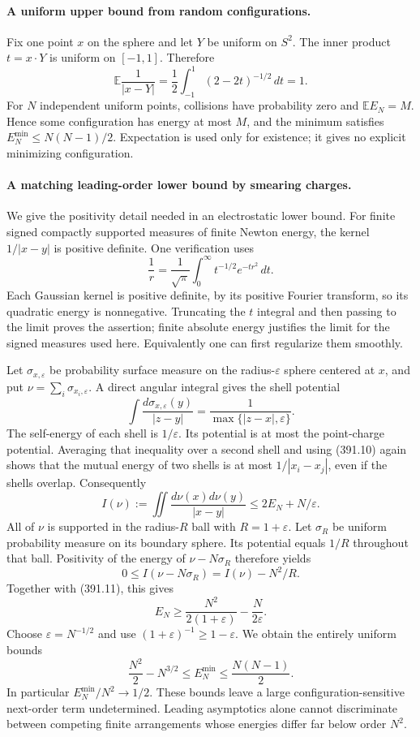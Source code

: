 \documentclass[11pt]{article}
\begin{document}
\paragraph{A uniform upper bound from random configurations.}
Fix one point $x$ on the sphere and let $Y$ be uniform on $S^2$.
The inner product $t=x\cdot Y$ is uniform on $[-1,1]$. Therefore
\[
 \mathbb E\frac1{|x-Y|}
   =\frac12\int_{-1}^1(2-2t)^{-1/2}\,dt=1.
\]
For $N$ independent uniform points, collisions have probability zero
and $\mathbb E E_N=M$. Hence some configuration has energy at most
$M$, and the minimum satisfies $E_N^{\min}\leq N(N-1)/2$.
Expectation is used only for existence; it gives no explicit
minimizing configuration.

\paragraph{A matching leading-order lower bound by smearing charges.}
We give the positivity detail needed in an electrostatic lower bound.
For finite signed compactly supported measures of finite Newton
energy, the kernel $1/|x-y|$ is positive definite. One verification
uses
\[
 \frac1r=\frac1{\sqrt\pi}\int_0^\infty t^{-1/2}e^{-tr^2}\,dt.
\]
Each Gaussian kernel is positive definite, by its positive Fourier
transform, so its quadratic energy is nonnegative. Truncating the
$t$ integral and then passing to the limit proves the assertion;
finite absolute energy justifies the limit for the signed measures
used here. Equivalently one can first regularize them smoothly.

Let $\sigma_{x,\varepsilon}$ be probability surface measure on the
radius-$\varepsilon$ sphere centered at $x$, and put
$\nu=\sum_i\sigma_{x_i,\varepsilon}$. A direct angular integral
gives the shell potential
\[
 \int\frac{d\sigma_{x,\varepsilon}(y)}{|z-y|}
   =\frac1{\max\{|z-x|,\varepsilon\}}.
 \tag{391.10}
\]
The self-energy of each shell is $1/\varepsilon$. Its potential
is at most the point-charge potential. Averaging that inequality
over a second shell and using (391.10) again shows that the mutual
energy of two shells is at most $1/|x_i-x_j|$, even if the shells
overlap. Consequently
\[
 I(\nu):=\iint\frac{d\nu(x)d\nu(y)}{|x-y|}
      \leq 2E_N+N/\varepsilon.
 \tag{391.11}
\]
All of $\nu$ is supported in the radius-$R$ ball with $R=1+\varepsilon$.
Let $\sigma_R$ be uniform probability measure on its boundary sphere.
Its potential equals $1/R$ throughout that ball. Positivity of the
energy of $\nu-N\sigma_R$ therefore yields
\[
 0\leq I(\nu-N\sigma_R)=I(\nu)-N^2/R.
\]
Together with (391.11), this gives
\[
 E_N\geq\frac{N^2}{2(1+\varepsilon)}-\frac N{2\varepsilon}.
 \tag{391.12}
\]
Choose $\varepsilon=N^{-1/2}$ and use
$(1+\varepsilon)^{-1}\geq1-\varepsilon$. We obtain the entirely
uniform bounds
\[
 \frac{N^2}{2}-N^{3/2}\leq E_N^{\min}\leq\frac{N(N-1)}2.
 \tag{391.13}
\]
In particular $E_N^{\min}/N^2\to1/2$. These bounds leave a large
configuration-sensitive next-order term undetermined. Leading
asymptotics alone cannot discriminate between competing finite
arrangements whose energies differ far below order $N^2$.
\end{document}
